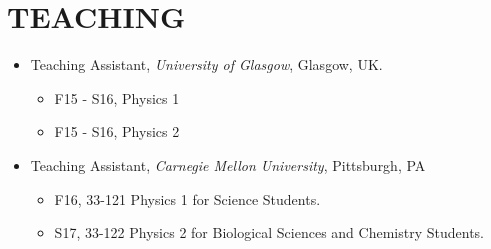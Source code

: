 \section{TEACHING}
\renewcommand\labelitemii{$\square$}
\begin{itemize}
\item Teaching Assistant, {\sl University of Glasgow}, Glasgow, UK.
\begin{itemize}
\item F15 - S16, Physics 1
\item F15 - S16, Physics 2
\end{itemize}
\item Teaching Assistant, {\sl Carnegie Mellon University}, Pittsburgh, PA
	\begin{itemize}
	\item F16, 33-121 Physics 1 for Science Students.
	\item S17, 33-122 Physics 2 for Biological Sciences and Chemistry Students.
	\end{itemize}
\end{itemize}
